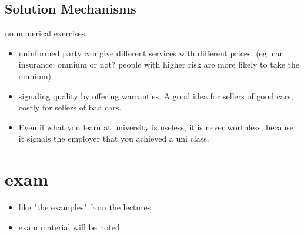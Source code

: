 \documentclass[12pt, a4paper, titlepage]{extarticle}
\begin{document}
    
    \subsection{Solution Mechanisms}
    no numerical exercises.
    \begin{itemize}
    \item uninformed party can give different services with different prices. (eg. car insurance: omnium or not? people with higher risk are more likely to take the omnium)
    \item signaling quality by offering warranties. A good idea for sellers of good cars, costly for sellers of bad cars.
    \item Even if what you learn at university is useless, it is never worthless, because it signals the employer that you achieved a uni class.
    
    \end{itemize}
    
    
\section{exam}
    \begin{itemize}
        \item like "the examples" from the lectures
        \item exam material will be noted
    \end{itemize}
\end{document}
